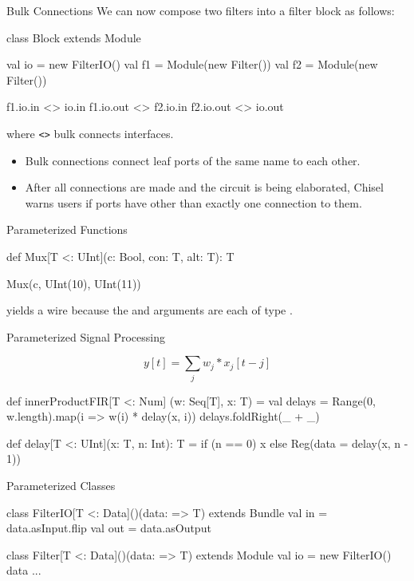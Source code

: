 \documentclass[xcolor=pdflatex,dvipsnames,table]{beamer}
\begin{document}
\begin{frame}[fragile]{Bulk Connections}
We can now compose two filters into a filter block as follows:

\begin{scala}
class Block extends Module { 
  val io = new FilterIO()
  val f1 = Module(new Filter())
  val f2 = Module(new Filter())

  f1.io.in  <> io.in
  f1.io.out <> f2.io.in
  f2.io.out <> io.out
}
\end{scala}

\noindent
where \verb+<>+ bulk connects interfaces.
\begin{itemize}
\item Bulk connections connect leaf ports of the same name to each other.
\item After all connections are made and the circuit is being elaborated,
Chisel warns users if ports have other than exactly one connection to them.
\end{itemize}

\end{frame}

\begin{frame}[fragile]{Parameterized Functions}
\begin{scala}
def Mux[T <: UInt](c: Bool, con: T, alt: T): T

Mux(c, UInt(10), UInt(11))
\end{scala}

\noindent
yields a  wire because the  and 
arguments are each of type .
\end{frame}

\begin{frame}[fragile]{Parameterized Signal Processing}

\begin{equation}
y[t] = \sum_j w_j * x_j[t-j]
\end{equation}

\begin{scala}
def innerProductFIR[T <: Num] (w: Seq[T], x: T) = {
  val delays = Range(0, w.length).map(i => w(i) * delay(x, i))
  delays.foldRight(_ + _)
}

def delay[T <: UInt](x: T, n: Int): T =
  if (n == 0) x else Reg(data = delay(x, n - 1))
\end{scala}

\end{frame}

\begin{frame}[fragile]{Parameterized Classes}
\begin{scala}
class FilterIO[T <: Data]()(data: => T) extends Bundle { 
  val in  = data.asInput.flip
  val out = data.asOutput
}

class Filter[T <: Data]()(data: => T) extends Module { 
  val io = new FilterIO(){ data }
  ...
}
\end{scala}
\end{frame}
\end{document}
